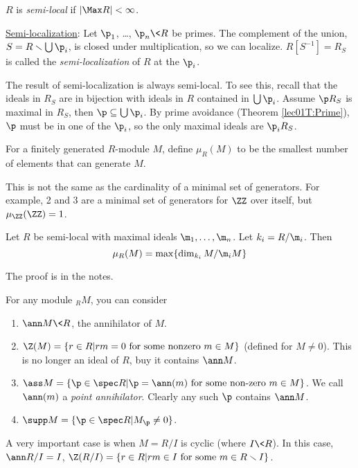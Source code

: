  \begin{definition}
   $R$ is \emph{semi-local} if $|\Max R|<\infty$.
 \end{definition}
 \underline{Semi-localization}: Let $\p_1$, \dots, $\p_n\< R$ be primes. The complement of
 the union, $S=R\smallsetminus \bigcup \p_i$, is closed under multiplication, so we can
 localize. $R[S^{-1}] = R_S$ is called the \emph{semi-localization}
  of $R$ at the $\p_i$.

 The result of semi-localization is always semi-local. To see this, recall that the ideals
 in $R_S$ are in bijection with ideals in $R$ contained in $\bigcup \p_i$. Assume $\p
 R_S$ is maximal in $R_S$, then $\p\subseteq \bigcup \p_i$. By prime avoidance (Theorem
 \ref{lec01T:Prime}), $\p$ must be in one of the $\p_i$, so the only maximal ideals are
 $\p_i R_S$.

 \begin{definition}
   For a finitely generated $R$-module $M$, define $\mu_R(M)$ to be the smallest number
   of elements that can generate $M$.
 \end{definition}
 This is not the same as the cardinality of a minimal set of generators. For example, 2
 and 3 are a minimal set of generators for $\ZZ$ over itself, but $\mu_\ZZ (\ZZ) =1$.

 \begin{theorem}
   Let $R$ be semi-local with maximal ideals $\m_1,\dots, \m_n$. Let $k_i = R/\m_i$. Then
   \[
     \mu_R(M) = \max \{\dim_{k_i} M/\m_i M\}
   \]
 \end{theorem}
 The proof is in the notes. 
 \setcounter{lecture}{4}


 For any module ${}_R M$, you can consider
 \begin{enumerate}
   \item $\ann M\< R$, the annihilator of $M$.

   \item $\Z(M) = \{r\in R|rm=0\text{ for some nonzero }m\in M\}$ (defined for $M\neq
       0$). This is no longer an ideal of $R$, buy it contains $\ann M$.

   \item $\ass M = \{\p\in \spec R| \p = \ann(m)\text{ for some non-zero }m\in M\}$. We
   call $\ann (m)$ a \emph{point annihilator}. Clearly any such $\p$ contains $\ann M$.

   \item $\supp M = \{\p\in \spec R| M_\p\neq 0\}$.
 \end{enumerate}
 A very important case is when $M=R/I$ is cyclic (where $I\< R$). In this case, $\ann R/I
 = I$, $\Z(R/I) = \{r\in R|rm\in I\text{ for some }m\in R\smallsetminus I\}$.

